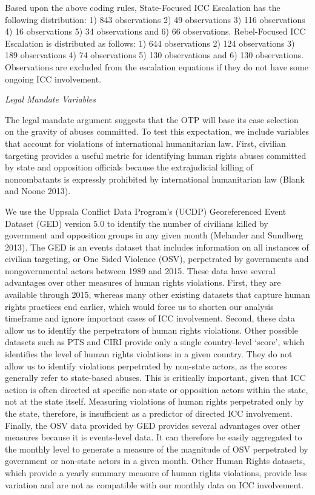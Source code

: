 Based upon the above coding rules, State-Focused ICC Escalation has the following distribution: 1) 843 observations 2) 49 observations 3) 116 observations 4) 16 observations 5) 34 observations and 6) 66 observations. Rebel-Focused ICC Escalation is distributed as follows: 1) 644 observations 2) 124 observations 3) 189 observations 4) 74 observations 5) 130 observations and 6) 130 observations. Observations are excluded from the escalation equations if they do not have some ongoing ICC involvement.

\emph{Legal Mandate Variables }

The legal mandate argument suggests that the OTP will base its case selection on the gravity of abuses committed. To test this expectation, we include variables that account for violations of international humanitarian law. First, civilian targeting provides a useful metric for identifying human rights abuses committed by state and opposition officials because the extrajudicial killing of noncombatants is expressly prohibited by international humanitarian law (Blank and Noone 2013).

We use the Uppsala Conflict Data Program's (UCDP) Georeferenced Event Dataset (GED) version 5.0 to identify the number of civilians killed by government and opposition groups in any given month (Melander and Sundberg 2013). The GED is an events dataset that includes information on all instances of civilian targeting, or One Sided Violence (OSV), perpetrated by governments and nongovernmental actors between 1989 and 2015. These data have several advantages over other measures of human rights violations. First, they are available through 2015, whereas many other existing datasets that capture human rights practices end earlier, which would force us to shorten our analysis timeframe and ignore important cases of ICC involvement. Second, these data allow us to identify the perpetrators of human rights violations. Other possible datasets such as PTS and CIRI provide only a single country-level `score', which identifies the level of human rights violations in a given country. They do not allow us to identify violations perpetrated by non-state actors, as the scores generally refer to state-based abuses. This is critically important, given that ICC action is often directed at specific non-state or opposition actors within the state, not at the state itself. Measuring violations of human rights perpetrated only by the state, therefore, is insufficient as a predictor of directed ICC involvement. Finally, the OSV data provided by GED provides several advantages over other measures because it is events-level data. It can therefore be easily aggregated to the monthly level to generate a measure of the magnitude of OSV perpetrated by government or non-state actors in a given month. Other Human Rights datasets, which provide a yearly summary measure of human rights violations, provide less variation and are not as compatible with our monthly data on ICC involvement.

